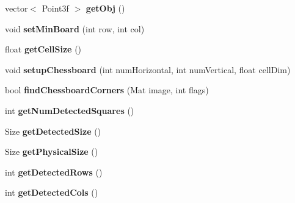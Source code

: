 \begin{DoxyCompactItemize}
\item 
vector$<$ Point3f $>$ {\bfseries get\+Obj} ()\hypertarget{classautoSizeBoard_a89915a169a019d0e542386d81dbc2e66}{}\label{classautoSizeBoard_a89915a169a019d0e542386d81dbc2e66}

\item 
void {\bfseries set\+Min\+Board} (int row, int col)\hypertarget{classautoSizeBoard_aabf153bce08fd66c74c373d6641fd18e}{}\label{classautoSizeBoard_aabf153bce08fd66c74c373d6641fd18e}

\item 
float {\bfseries get\+Cell\+Size} ()\hypertarget{classautoSizeBoard_aab2271090efcd2fdbc2c4a7bfcd83865}{}\label{classautoSizeBoard_aab2271090efcd2fdbc2c4a7bfcd83865}

\item 
void {\bfseries setup\+Chessboard} (int num\+Horizontal, int num\+Vertical, float cell\+Dim)\hypertarget{classautoSizeBoard_a78d5effbeb345ab558e3005bc647ea75}{}\label{classautoSizeBoard_a78d5effbeb345ab558e3005bc647ea75}

\item 
bool {\bfseries find\+Chessboard\+Corners} (Mat image, int flags)\hypertarget{classautoSizeBoard_a708bc58bb6378d1e68bdcd88f7fb6ce0}{}\label{classautoSizeBoard_a708bc58bb6378d1e68bdcd88f7fb6ce0}

\item 
int {\bfseries get\+Num\+Detected\+Squares} ()\hypertarget{classautoSizeBoard_a42ace17d6b62d29f479ba825c6ecfa13}{}\label{classautoSizeBoard_a42ace17d6b62d29f479ba825c6ecfa13}

\item 
Size {\bfseries get\+Detected\+Size} ()\hypertarget{classautoSizeBoard_aeb0f981b974051e6cdc4144483916163}{}\label{classautoSizeBoard_aeb0f981b974051e6cdc4144483916163}

\item 
Size {\bfseries get\+Physical\+Size} ()\hypertarget{classautoSizeBoard_ad8176f03e68c47c0cfe2113d3d8fdf12}{}\label{classautoSizeBoard_ad8176f03e68c47c0cfe2113d3d8fdf12}

\item 
int {\bfseries get\+Detected\+Rows} ()\hypertarget{classautoSizeBoard_a3b83e798ed4ebeefc17fb75268e5aa8a}{}\label{classautoSizeBoard_a3b83e798ed4ebeefc17fb75268e5aa8a}

\item 
int {\bfseries get\+Detected\+Cols} ()\hypertarget{classautoSizeBoard_a031e73274170e488ef06e6529d376f2b}{}\label{classautoSizeBoard_a031e73274170e488ef06e6529d376f2b}


\end{DoxyCompactItemize}
